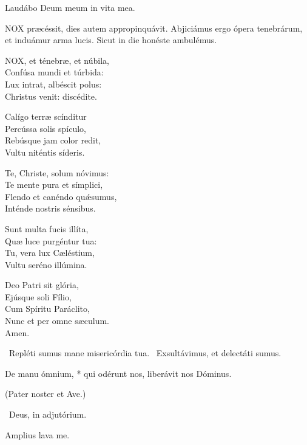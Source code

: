  Laudábo Deum meum in vita mea.



\lettrine[lines=2]{N}{OX} præcéssit, dies autem appropinquávit. Abjiciámus ergo ópera tenebrárum, et induámur arma lucis. Sicut in die honéste ambulémus.


\lettrine[lines=2]{N}{OX}, et ténebræ, et núbila,\\
Confúsa mundi et túrbida:\\
Lux intrat, albéscit polus:\\
Christus venit: discédite.

Calígo terræ scínditur\\
Percússa solis spículo,\\
Rebúsque jam color redit,\\
Vultu niténtis síderis.

Te, Christe, solum nóvimus:\\
Te mente pura et símplici,\\
Flendo et canéndo quǽsumus,\\
Inténde nostris sénsibus.

Sunt multa fucis illíta,\\
Quæ luce purgéntur tua:\\
Tu, vera lux Cæléstium,\\
Vultu seréno illúmina.

Deo Patri sit glória,\\
Ejúsque soli Fílio,\\
Cum Spíritu Paráclito,\\
Nunc et per omne sæculum.\\
Amen.

\V\ Repléti sumus mane misericórdia tua. \R\ Exsultávimus, et delectáti sumus.

 De manu ómnium, * qui odérunt nos, liberávit nos Dóminus.




(Pater noster et Ave.)

\V\ Deus, in adjutórium.

 Amplius lava me.

